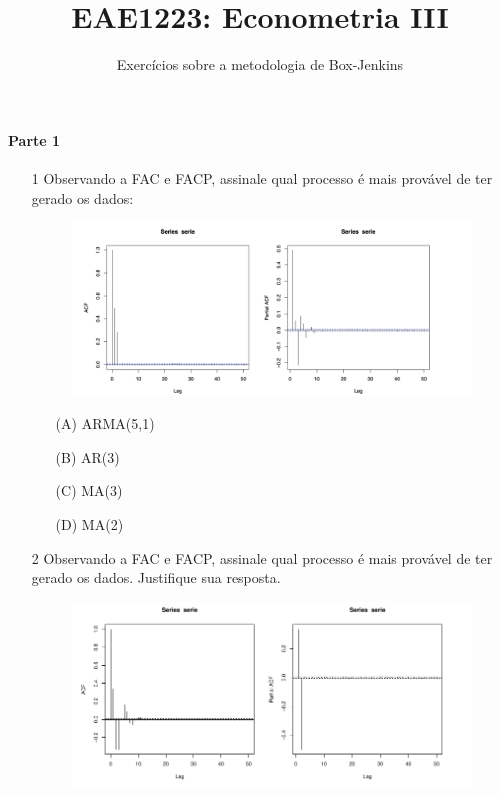 \documentclass[10pt,a4paper]{article}
\title{\large EAE1223: Econometria III}
\author{\normalsize Exercícios sobre a metodologia de Box-Jenkins}
\date{}
\begin{document}
	\maketitle
	\paragraph{Parte 1}
	
	\begin{enumerate} 
		\item[1] Observando a FAC e FACP, assinale qual processo é mais provável de ter gerado os dados:
		
		\begin{figure}[H]
			\includegraphics[scale=0.5]{figuras/fac_facp_1.png}
			
		\end{figure}
		
		\begin{enumerate}
			\item[(A)] ARMA(5,1)
			\item[(B)] AR(3) 
			\item[(C)] MA(3)
			\item[(D)] MA(2)
		\end{enumerate}
		
		\item[2] Observando a FAC e FACP, assinale qual processo é mais provável de ter gerado os dados. Justifique sua resposta.
		
		\begin{figure}[H]
			\centering 
			\includegraphics[scale=0.45]{figuras/fac_facp_2.png} 
		\end{figure}
		

\end{enumerate}
\end{document}
